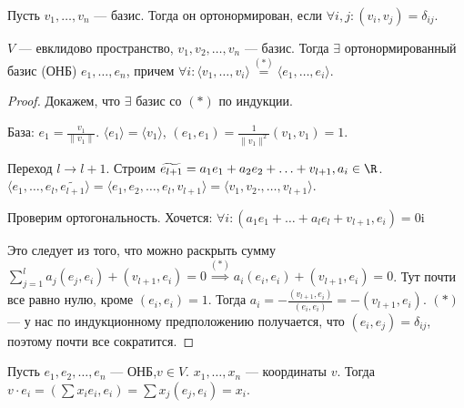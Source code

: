 \begin{definition}
    Пусть $v_1, \ldots, v_n$ --- базис. Тогда он ортонормирован, если $\forall i,j\!: (v_i, v_j) = \delta_{ij}$.
\end{definition}
\begin{theorem}
    $V$ --- евклидово пространство,  $v_1, v_2, \ldots, v_n$ --- базис.
    Тогда $\exists$ ортонормированный базис (ОНБ)  $e_1, \ldots, e_n$, причем $\forall i\!: \langle v_1, \ldots, v_i\rangle \overset{(*)}{=} \langle e_1, \ldots, e_i\rangle$.
\end{theorem}
\begin{proof}
    Докажем, что $\exists$ базис со  $(*)$ по индукции.

    База: $e_1 = \frac{v_1}{\|v_1\|}$. $\langle e_1\rangle = \langle v_1\rangle$, $(e_1, e_1) = \frac{1}{\|v_1\|^2} (v_1, v_1) = 1$.

    Переход $l \to l+1$.  Строим  $\widetilde{e_{l+1}} = a_1e_1 + a_2e_2 + \ldots + v_{l+1}, a_i \in \R$. $\langle e_1, \ldots, e_l, \widetilde{e_{l+1}} \rangle = \langle e_1, e_2, \ldots, e_l, v_{l+1} \rangle = \langle v_1, v_2., \ldots, v_{l+1}\rangle$.

    Проверим ортогональность. Хочется: $\forall i\!: (a_1e_1 + \ldots + a_le_l + v_{l+1}, e_i) = 0$i

    Это следует из того, что можно раскрыть сумму $\sum\limits_{j=1}^l a_j(e_j, e_i) + (v_{l+1}, e_i) = 0 \overset{(*)}{\implies} a_i(e_i, e_i) + (v_{l+1}, e_i) = 0$. Тут почти все равно нулю, кроме  $(e_i, e_i) = 1$. Тогда  $a_i = - \frac{(v_{l+1}, e_i)}{(e_i, e_i)} = -(v_{l+1}, e_i)$. $(*)$ --- у нас по индукционному предположению получается, что  $(e_i, e_j) = \delta_{ij}$, поэтому почти все сократится.
\end{proof}
\begin{remark}
    Пусть $e_1, e_2, \ldots, e_n$ --- ОНБ,$v \in V$.  $x_1, \ldots, x_n$ --- координаты $v$. Тогда  $v\cdot e_i = (\sum x_i e_i, e_i) = \sum x_j(e_j, e_i) = x_i$.
\end{remark}

